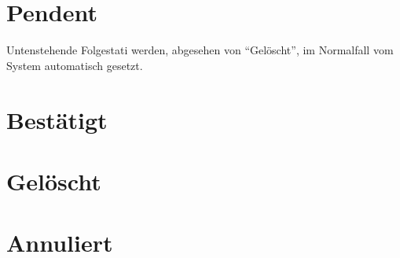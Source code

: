 \documentclass[a4paper]{scrreprt}
\begin{document}
        \section{Pendent}
        Untenstehende Folgestati werden, abgesehen von ``Gelöscht'', im
        Normalfall vom System automatisch gesetzt. \\

        \section{Bestätigt}

        \section{Gelöscht}

        \section{Annuliert}
\end{document}
